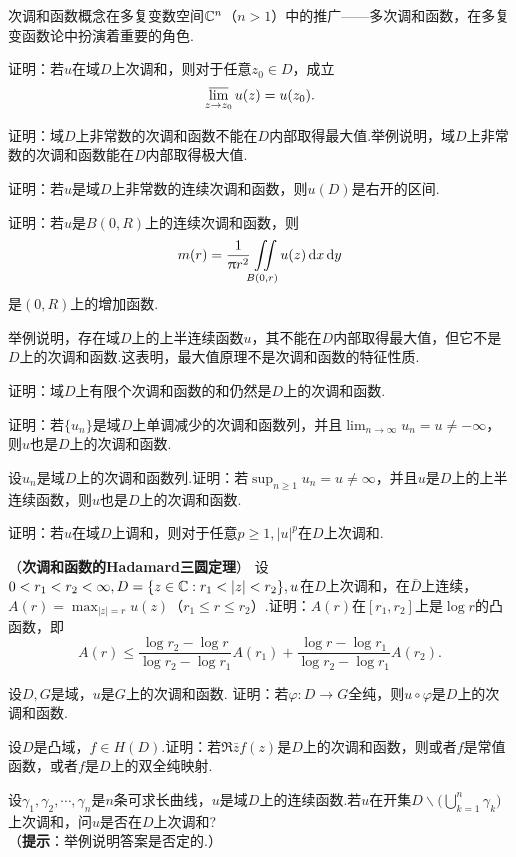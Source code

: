 次调和函数概念在多复变数空间$\mathbb C^n$（$n>1$）中的推广——多次调和函数，在多复变函数论中扮演着重要的角色.
\begin{xiti}
  \item 证明：若$u$在域$D$上次调和，则对于任意$z_0\in D$，成立
    \[
      \varlimsup_{z\to z_0}u(z) = u(z_0).
    \]
  \item 证明：域$D$上非常数的次调和函数不能在$D$内部取得最大值.举例说明，域$D$上非常数的次调和函数能在$D$内部取得极大值.
  \item 证明：若$u$是域$D$上非常数的连续次调和函数，则$u(D)$是右开的区间.
  \item 证明：若$u$是$B(0,R)$上的连续次调和函数，则
    \[
      m(r) = \frac1{\uppi r^2}\iint\limits_{B(0,r)}u(z)\mathop{}\!\mathrm dx\mathop{}\!\mathrm dy
    \]
    是$(0,R)$上的增加函数.
  \item 举例说明，存在域$D$上的上半连续函数$u$，其不能在$D$内部取得最大值，但它不是$D$上的次调和函数.这表明，最大值原理不是次调和函数的特征性质.
  \item 证明：域$D$上有限个次调和函数的和仍然是$D$上的次调和函数.
  \item 证明：若$\{u_n\}$是域$D$上单调减少的次调和函数列，并且$\lim_{n\to\infty}u_n=u\ne-\infty$，则$u$也是$D$上的次调和函数.
  \item 设${u_n}$是域$D$上的次调和函数列.证明：若$\sup_{n\ge1}u_n=u\ne\infty$，并且$u$是$D$上的上半连续函数，则$u$也是$D$上的次调和函数.
  \item 证明：若$u$在域$D$上调和，则对于任意$p\ge1,|u|^p$在$D$上次调和.
  \item （\textbf{次调和函数的Hadamard三圆定理}）
      设$0<r_1<r_2<\infty,D=\{z\in\MC:r_1<|z|<r_2\},u$在$D$上次调和，在$\bar D$上连续，$A(r)=\max_{|z|=r}u(z)$（$r_1\le r\le r_2$）.证明：$A(r)$在$[r_1,r_2]$上是$\log r$的凸函数，即
      \[
        A(r)\le\frac{\log r_2-\log r}{\log r_2-\log r_1}A(r_1)+\frac{\log r-\log r_1}
        {\log r_2-\log r_1}A(r_2).
      \]
  \item 设$D,G$是域，$u$是$G$上的次调和函数. 证明：若$\varphi:D\to G$全纯，则$u\circ \varphi$是$D$上的次调和函数.
  \item 设$D$是凸域，$f\in H(D)$.证明：若$\Re\bar zf(z)$是$D$上的次调和函数，则或者$f$是常值函数，或者$f$是$D$上的双全纯映射.
  \item 设$\gamma_1,\gamma_2,\cdots,\gamma_n$是$n$条可求长曲线，$u$是域$D$上的连续函数.若$u$在开集$D\backslash\big(\bigcup_{k=1}^n\gamma_k\big)$上次调和，问$u$是否在$D$上次调和?\\
      （\textbf{提示}：举例说明答案是否定的.）

\end{xiti}
